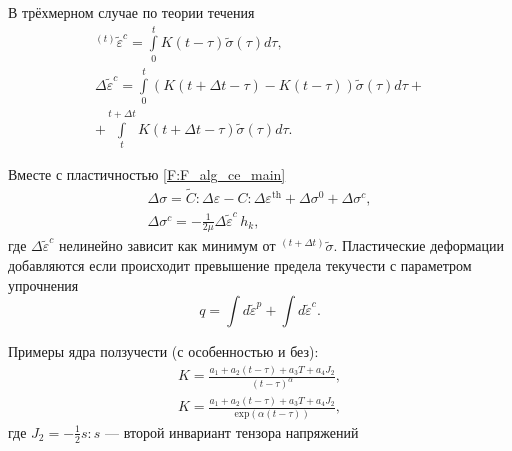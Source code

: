 В трёхмерном случае по теории течения
\begin{equation}
\begin{gathered}
{}^{(t)}\tilde{\varepsilon}^{c}=\int\limits_0^t K\left(t-\tau\right) \tilde{\sigma}\left(\tau \right)d\tau,\\
\Delta\tilde{\varepsilon}^{c}=\int\limits_0^{t} \left( K\left(t+\Delta t-\tau\right)-K\left(t-\tau\right)\right)  \tilde{\sigma}\left(\tau \right)d\tau+\\
+\int\limits_t^{t+\Delta t} K\left(t+\Delta t-\tau\right) \tilde{\sigma}\left(\tau \right)d\tau.
\label{F:F_creep_3d}
\end{gathered}
\end{equation}

Вместе с пластичностью \eqref{F:F_alg_ce_main}
\begin{equation}
\begin{gathered}
\Delta\sigma=\tilde{C}:\Delta\varepsilon-C:\Delta\varepsilon^{\mathrm{th}}+\Delta\sigma^{0}+\Delta\sigma^{c},\\
\Delta\sigma^{c}=-\frac{1}{2\mu}\Delta\tilde{\varepsilon}^{c}\,h_{k},
\end{gathered}
\label{F:F_creep_ce}
\end{equation}
где $\Delta\tilde{\varepsilon}^{c}$ нелинейно зависит как минимум от ${}^{(t+\Delta t)}\tilde{\sigma}$. Пластические деформации добавляются если происходит превышение предела текучести с параметром упрочнения
\begin{equation}
q=\int d\tilde{\varepsilon}^{p}+\int d\tilde{\varepsilon}^{c}.
\label{F:F_creep_Odquist}
\end{equation}

Примеры ядра ползучести \cite{Zarubin2005} (с особенностью и без):
\begin{equation}
\begin{gathered}
K=\frac{a_1+a_2\left(t-\tau\right)+a_3 T+a_4 J_2}{\left(t-\tau\right)^{\alpha}},\\
K=\frac{a_1+a_2\left(t-\tau\right)+a_3 T+a_4 J_2}{\mathrm{exp}\left(\alpha\left(t-\tau\right)\right)},
\end{gathered}
\label{F:F_creep_core}
\end{equation}
где $J_2=-\frac{1}{2}s:s$ --- второй инвариант тензора напряжений


